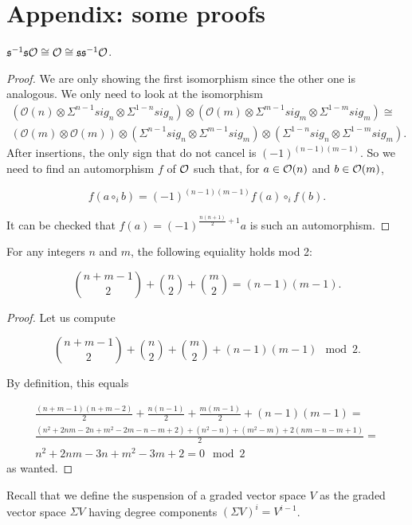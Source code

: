 \documentclass[twoside]{article}
\begin{document}
\section{Appendix: some proofs}

\begin{lemma}
$\mathfrak{s}^{-1}\mathfrak{s}{\mathcal O}\cong{\mathcal O}\cong\mathfrak{s}\mathfrak{s}^{-1}{\mathcal O}$.
\end{lemma}
\begin{proof}
We are only showing the first isomorphism since the other one is analogous. We only need to look at the isomorphism
\begin{align*}
(\mathcal{O}(n)\otimes\Sigma^{n-1}sig_n\otimes \Sigma^{1-n}sig_n)\otimes (\mathcal{O}(m)\otimes\Sigma^{m-1}sig_m\otimes \Sigma^{1-m}sig_m)\cong\\ (\mathcal{O}(m)\otimes \mathcal{O}(m))\otimes (\Sigma^{n-1}sig_n\otimes \Sigma^{m-1}sig_m)\otimes (\Sigma^{1-n}sig_n\otimes \Sigma^{1-m}sig_m).
\end{align*}
After insertions, the only sign that do not cancel is $(-1)^{(n-1)(m-1)}$. So we need to find an automorphism $f$ of ${\mathcal O}$ such that, for $a\in{\mathcal O}(n)$ and $b\in{\mathcal O}(m)$,

$$f(a\circ_i b)=(-1)^{(n-1)(m-1)}f(a)\circ_i f(b).$$

It can be checked that $f(a)=(-1)^{\frac{n(n+1)}{2}+1}a$ is such an automorphism.
\end{proof}

\begin{lemma}
For any integers $n$ and $m$, the following equiality  holds mod 2:

$$\binom{n+m-1}{2}+\binom{n}{2}+\binom{m}{2}=(n-1)(m-1).$$
\end{lemma}
\begin{proof}
Let us compute 

$$\binom{n+m-1}{2}+\binom{n}{2}+\binom{m}{2}+(n-1)(m-1)\mod 2.$$

By definition, this equals

\begin{gather*}
\frac{(n+m-1)(n+m-2)}{2}+\frac{n(n-1)}{2}+\frac{m(m-1)}{2}+(n-1)(m-1)=\\
\frac{(n^2+2nm-2n+m^2-2m-n-m+2)+(n^2-n)+(m^2-m)+2(nm-n-m+1)}{2}=\\
n^2+2nm-3n+m^2-3m+2=0\mod 2
\end{gather*}
as wanted.


\end{proof}

Recall that we define the suspension of a graded vector space $V$ as the graded vector space $\Sigma V$ having degree components $(\Sigma V)^i=V^{i-1}$.
\end{document}
